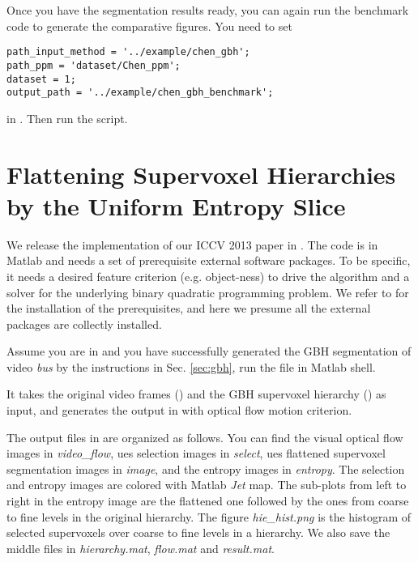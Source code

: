 \documentclass{article}
\begin{document}
Once you have the segmentation results ready, you can again run the benchmark code to generate the comparative figures. You need to set
\begin{verbatim}
path_input_method = '../example/chen_gbh';
path_ppm = 'dataset/Chen_ppm';
dataset = 1;
output_path = '../example/chen_gbh_benchmark';
\end{verbatim}
in . Then run the script.


\section{Flattening Supervoxel Hierarchies by the Uniform Entropy Slice}
\label{sec:ues}
We release the implementation of our ICCV 2013 paper in . The code is in Matlab and needs a set of prerequisite external software packages. To be specific, it needs a desired feature criterion (e.g. object-ness) to drive the algorithm and a solver for the underlying binary quadratic programming problem. We refer to  for the installation of the prerequisites, and here we presume all the external packages are collectly installed.

Assume you are in  and you have successfully generated the GBH segmentation of video \textit{bus} by the instructions in Sec. \ref{sec:gbh}, run the file  in Matlab shell.

It takes the original video frames () and the GBH supervoxel hierarchy () as input, and generates the output in  with optical flow motion criterion.

The output files in  are organized as follows. You can find the visual optical flow images in \textit{video\_flow}, ues selection images in \textit{select}, ues flattened supervoxel segmentation images in \textit{image}, and the entropy images in \textit{entropy}. The selection and entropy images are colored with Matlab \textit{Jet} map. The sub-plots from left to right in the entropy image are the flattened one followed by the ones from coarse to fine levels in the original hierarchy. The figure \textit{hie\_hist.png} is the histogram of selected supervoxels over coarse to fine levels in a hierarchy. We also save the middle files in \textit{hierarchy.mat}, \textit{flow.mat} and \textit{result.mat}.
\end{document}
